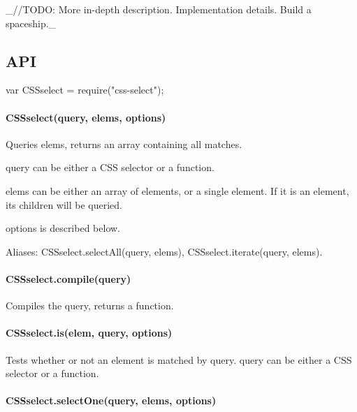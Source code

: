 \+\_\+//\+T\+O\+DO\+: More in-\/depth description. Implementation details. Build a spaceship.\+\_\+

\subsection*{A\+PI}


\begin{DoxyCode}
var CSSselect = require("css-select");
\end{DoxyCode}


\paragraph*{{\ttfamily C\+S\+Sselect(query, elems, options)}}

Queries {\ttfamily elems}, returns an array containing all matches.


\begin{DoxyItemize}
\item {\ttfamily query} can be either a C\+SS selector or a function.
\item {\ttfamily elems} can be either an array of elements, or a single element. If it is an element, its children will be queried.
\item {\ttfamily options} is described below.
\end{DoxyItemize}

Aliases\+: {\ttfamily C\+S\+Sselect.\+select\+All(query, elems)}, {\ttfamily C\+S\+Sselect.\+iterate(query, elems)}.

\paragraph*{{\ttfamily C\+S\+Sselect.\+compile(query)}}

Compiles the query, returns a function.

\paragraph*{{\ttfamily C\+S\+Sselect.\+is(elem, query, options)}}

Tests whether or not an element is matched by {\ttfamily query}. {\ttfamily query} can be either a C\+SS selector or a function.

\paragraph*{{\ttfamily C\+S\+Sselect.\+select\+One(query, elems, options)}}

